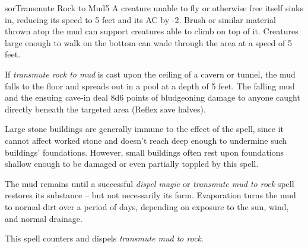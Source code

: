 \begin{spellcard}{sor}{Transmute Rock to Mud}{5}
  \medskip
  A creature unable to fly or otherwise free itself sinks in,
  reducing its speed to 5 feet and its AC by -2.
  Brush or similar material thrown atop the mud can
  support creatures able to climb on top of it. Creatures large enough to
  walk on the bottom can wade through the area at a speed of 5 feet.

  If \emph{transmute rock to mud} is cast upon the ceiling of a cavern or
  tunnel, the mud falls to the floor and spreads out in a pool at a depth
  of 5 feet. The falling mud and the ensuing cave-in deal 8d6 points of
  bludgeoning damage to anyone caught directly beneath the targeted area
  (Reflex save halves).

  Large stone buildings are generally immune to the effect of the spell,
  since it cannot affect worked stone and doesn't reach deep enough to
  undermine such buildings' foundations.
  However, small buildings often rest upon foundations shallow enough
  to be damaged or even partially toppled by this spell.

  The mud remains until a successful \emph{dispel magic} or
  \emph{transmute mud to rock} spell restores its substance -- but not
  necessarily its form.
  Evaporation turns the mud to normal dirt over a period of days,
  depending on exposure to the sun, wind, and normal drainage.

  \medskip
  This spell counters and dispels \emph{transmute mud to rock}.

\end{spellcard}
